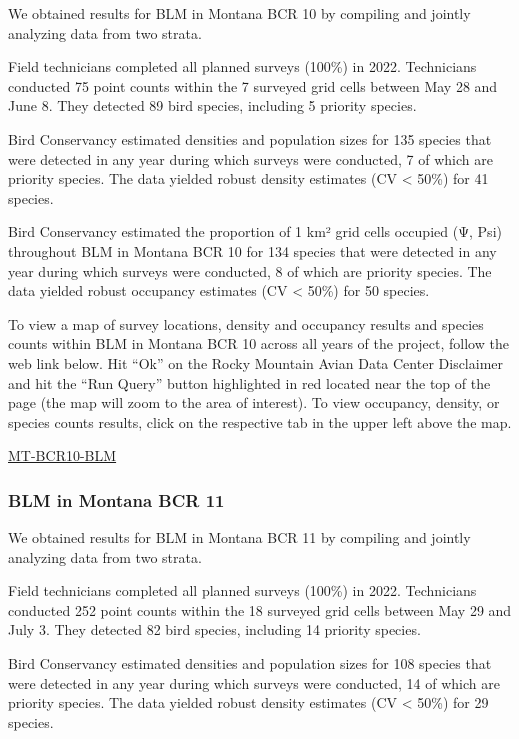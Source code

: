 \documentclass[
  letterpaper,
  DIV=11,
  numbers=noendperiod,
  oneside]{scrreprt}
\begin{document}
We obtained results for BLM in Montana BCR 10 by compiling and jointly
analyzing data from two strata.

Field technicians completed all planned surveys (100\%) in 2022.
Technicians conducted 75 point counts within the 7 surveyed grid cells
between May 28 and June 8. They detected 89 bird species, including 5
priority species.

Bird Conservancy estimated densities and population sizes for 135
species that were detected in any year during which surveys were
conducted, 7 of which are priority species. The data yielded robust
density estimates (CV \textless{} 50\%) for 41 species.

Bird Conservancy estimated the proportion of 1 km² grid cells occupied
(Ψ, Psi) throughout BLM in Montana BCR 10 for 134 species that were
detected in any year during which surveys were conducted, 8 of which are
priority species. The data yielded robust occupancy estimates (CV
\textless{} 50\%) for 50 species.

To view a map of survey locations, density and occupancy results and
species counts within BLM in Montana BCR 10 across all years of the
project, follow the web link below. Hit ``Ok'' on the Rocky Mountain
Avian Data Center Disclaimer and hit the ``Run Query'' button
highlighted in red located near the top of the page (the map will zoom
to the area of interest). To view occupancy, density, or species counts
results, click on the respective tab in the upper left above the map.

\href{http://www.rmbo.org/new_site/adc/QueryWindow.aspx\#N4IgzgrgDgpgTmALnAhoiBbEAuABCAWQBUBaAIQGEAlARgAZyAZAkAXyA===}{MT-BCR10-BLM}

\hypertarget{blm-in-montana-bcr-11}{%
\subsubsection{BLM in Montana BCR 11}\label{blm-in-montana-bcr-11}}

We obtained results for BLM in Montana BCR 11 by compiling and jointly
analyzing data from two strata.

Field technicians completed all planned surveys (100\%) in 2022.
Technicians conducted 252 point counts within the 18 surveyed grid cells
between May 29 and July 3. They detected 82 bird species, including 14
priority species.

Bird Conservancy estimated densities and population sizes for 108
species that were detected in any year during which surveys were
conducted, 14 of which are priority species. The data yielded robust
density estimates (CV \textless{} 50\%) for 29 species.
\end{document}
